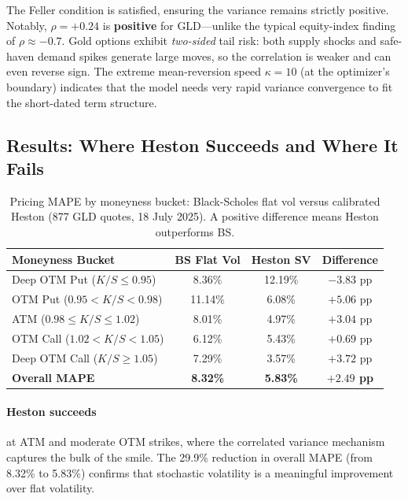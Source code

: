 \documentclass[12pt, a4paper]{article}
\begin{document}
The Feller condition is satisfied, ensuring the variance remains strictly positive. Notably, $\rho = +0.24$ is \textbf{positive} for GLD---unlike the typical equity-index finding of $\rho\approx-0.7$. Gold options exhibit \emph{two-sided} tail risk: both supply shocks and safe-haven demand spikes generate large moves, so the correlation is weaker and can even reverse sign. The extreme mean-reversion speed $\kappa=10$ (at the optimizer's boundary) indicates that the model needs very rapid variance convergence to fit the short-dated term structure.

\subsection{Results: Where Heston Succeeds and Where It Fails}
\label{subsec:heston-results}

\begin{table}[H]
\centering
\small
\begin{tabular}{@{}lccc@{}}\toprule
\textbf{Moneyness Bucket} & \textbf{BS Flat Vol} & \textbf{Heston SV} & \textbf{Difference}\\
\midrule
Deep OTM Put ($K/S\leq 0.95$) & 8.36\% & 12.19\% & $-3.83$ pp\\
OTM Put ($0.95 < K/S < 0.98$) & 11.14\% & 6.08\% & $+5.06$ pp\\
ATM ($0.98\leq K/S\leq 1.02$) & 8.01\% & 4.97\% & $+3.04$ pp\\
OTM Call ($1.02 < K/S < 1.05$) & 6.12\% & 5.43\% & $+0.69$ pp\\
Deep OTM Call ($K/S\geq 1.05$) & 7.29\% & 3.57\% & $+3.72$ pp\\
\midrule
\bfseries Overall MAPE & \bfseries 8.32\% & \bfseries 5.83\% & \bfseries $+2.49$ pp\\
\bottomrule
\end{tabular}
\caption{Pricing MAPE by moneyness bucket: Black-Scholes flat vol versus calibrated Heston (877 GLD quotes, 18 July 2025). A positive difference means Heston outperforms BS.}
\label{tab:heston-results}
\end{table}

\paragraph{Heston succeeds} at ATM and moderate OTM strikes, where the correlated variance mechanism captures the bulk of the smile. The 29.9\% reduction in overall MAPE (from 8.32\% to 5.83\%) confirms that stochastic volatility is a meaningful improvement over flat volatility.
\end{document}
